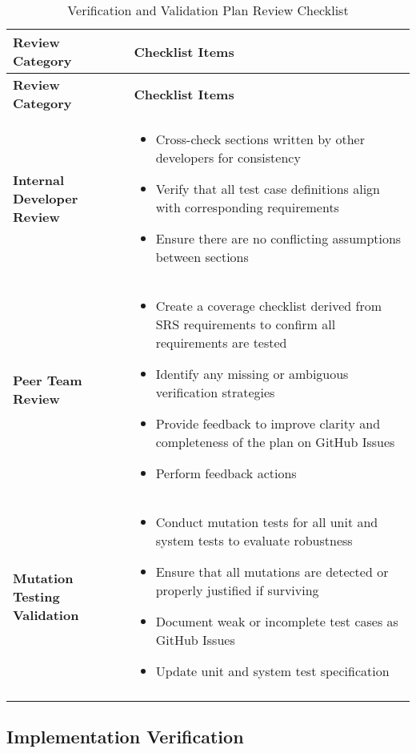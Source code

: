\documentclass[12pt, titlepage]{article}
\begin{document}
\begin{longtable}{|p{4cm}|p{11cm}|}
\hline
\textbf{Review Category} & \textbf{Checklist Items} \\
\hline
\endfirsthead

\hline
\textbf{Review Category} & \textbf{Checklist Items} \\
\hline
\endhead

\textbf{Internal Developer Review} &
\begin{itemize}
  \item Cross-check sections written by other developers for consistency
  \item Verify that all test case definitions align with corresponding requirements
  \item Ensure there are no conflicting assumptions between sections
\end{itemize}
\\
\hline

\textbf{Peer Team Review} &
\begin{itemize}
  \item Create a coverage checklist derived from SRS requirements to confirm all requirements are tested
  \item Identify any missing or ambiguous verification strategies
  \item Provide feedback to improve clarity and completeness of the plan on GitHub Issues
  \item Perform feedback actions
\end{itemize}
\\
\hline

\textbf{Mutation Testing Validation} &
\begin{itemize}
  \item Conduct mutation tests for all unit and system tests to evaluate robustness
  \item Ensure that all mutations are detected or properly justified if surviving
  \item Document weak or incomplete test cases as GitHub Issues
  \item Update unit and system test specification
\end{itemize}
\\
\hline

\caption{Verification and Validation Plan Review Checklist}
\label{tab:vnv_plan_checklist}
\end{longtable}

\subsection{Implementation Verification}
\end{document}
